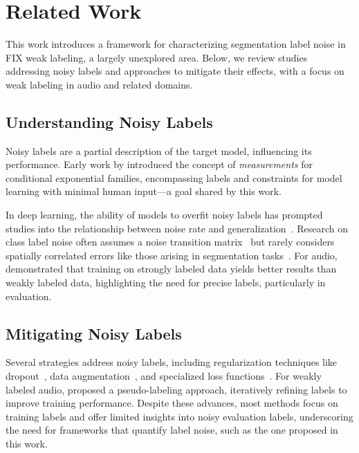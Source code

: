 \section{Related Work}

This work introduces a framework for characterizing segmentation label noise in FIX weak labeling, a largely unexplored area. Below, we review studies addressing noisy labels and approaches to mitigate their effects, with a focus on weak labeling in audio and related domains.

\subsection{Understanding Noisy Labels}

Noisy labels are a partial description of the target model, influencing its performance. Early work by \citet{Liang2009} introduced the concept of \textit{measurements} for conditional exponential families, encompassing labels and constraints for model learning with minimal human input—a goal shared by this work.

In deep learning, the ability of models to overfit noisy labels has prompted studies into the relationship between noise rate and generalization~\citep{Zhang2021, Chen2019}. Research on class label noise often assumes a noise transition matrix~\citep{Li2021} but rarely considers spatially correlated errors like those arising in segmentation tasks~\citep{Yao2023}. For audio, \citet{Hershey2021} demonstrated that training on strongly labeled data yields better results than weakly labeled data, highlighting the need for precise labels, particularly in evaluation.

\subsection{Mitigating Noisy Labels}

Several strategies address noisy labels, including regularization techniques like dropout~\citep{Srivastava2014}, data augmentation~\citep{Shorten2019}, and specialized loss functions~\citep{Fonseca2019_agnostic}. For weakly labeled audio, \citet{Dinkel2022} proposed a pseudo-labeling approach, iteratively refining labels to improve training performance. Despite these advances, most methods focus on training labels and offer limited insights into noisy evaluation labels, underscoring the need for frameworks that quantify label noise, such as the one proposed in this work.

